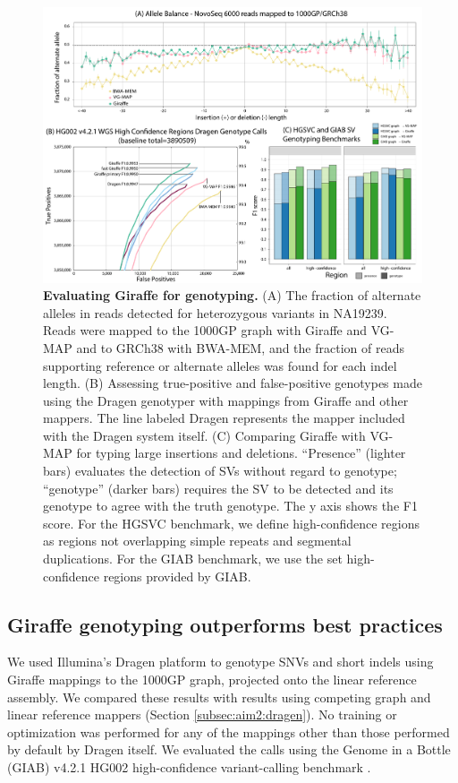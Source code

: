 \documentclass[11pt]{ucscthesis}
\begin{document}
\begin{figure}
    \centering
    \includegraphics[width=\linewidth]{aim2_fig4.pdf}
    \caption[Evaluating Giraffe for genotyping with short reads]{\textbf{Evaluating Giraffe for genotyping.} (A) The fraction of alternate alleles in reads detected for heterozygous variants in NA19239. Reads were mapped to the 1000GP graph with Giraffe and VG-MAP and to GRCh38 with BWA-MEM, and the fraction of reads supporting reference or alternate alleles was found for each indel length. (B) Assessing true-positive and false-positive genotypes made using the Dragen genotyper with mappings from Giraffe and other mappers. The line labeled Dragen represents the mapper included with the Dragen system itself. (C) Comparing Giraffe with VG-MAP for typing large insertions and deletions. “Presence” (lighter bars) evaluates the detection of SVs without regard to genotype; “genotype” (darker bars) requires the SV to be detected and its genotype to agree with the truth genotype. The y axis shows the F1 score. For the HGSVC benchmark, we define high-confidence regions as regions not overlapping simple repeats and segmental duplications. For the GIAB benchmark, we use the set high-confidence regions provided by GIAB.}
    \label{fig:aim2_fig4}
\end{figure}

\subsection{Giraffe genotyping outperforms best practices}
We used Illumina’s Dragen platform \cite{illumina_dragen_2019} to genotype SNVs and short indels using Giraffe mappings to the 1000GP graph, projected onto the linear reference assembly.
We compared these results with results using competing graph and linear reference mappers (Section \ref{subsec:aim2:dragen}).
No training or optimization was performed for any of the mappings other than those performed by default by Dragen itself. We evaluated the calls using the Genome in a Bottle (GIAB) v4.2.1 HG002 high-confidence variant-calling benchmark \cite{wagner_benchmarking_2020}.
\end{document}
